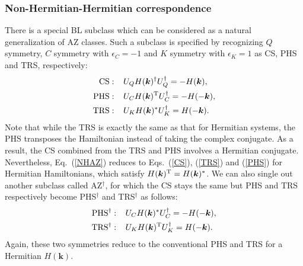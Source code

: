 \documentclass{tADP2e}
\theoremstyle{plain}
\theoremstyle{plain}
\theoremstyle{definition}
\begin{document}
\subsubsection{Non-Hermitian-Hermitian correspondence}
\label{Sec:NHHC}
There is a special BL subclass which can be considered as a natural generalization of AZ classes. Such a subclass is specified by recognizing $Q$ symmetry, $C$ symmetry with $\epsilon_C=-1$ and $K$ symmetry with $\epsilon_K=1$ as CS, PHS and TRS, respectively:
\begin{equation}
\begin{split}
{\rm CS:}\;\;\;\; &U_QH(\boldsymbol{k})^\dag U_Q^\dag=-H(\boldsymbol{k}), \\
{\rm PHS:}\;\;\;\; &U_CH(\boldsymbol{k})^{\rm T}U_C^\dag=-H(-\boldsymbol{k}),  \\
{\rm TRS:}\;\;\;\; &U_KH(\boldsymbol{k})^*U_K^\dag=H(-\boldsymbol{k}). \\
\end{split}
\label{NHAZ}
\end{equation}
Note that while the TRS is exactly the same as that for Hermitian systems, the PHS transposes the Hamiltonian instead of taking the complex conjugate. As a result, the CS combined from the TRS and PHS involves a Hermitian conjugate. Nevertheless, Eq.~(\ref{NHAZ}) reduces to Eqs.~(\ref{CS}), (\ref{TRS}) and (\ref{PHS}) for Hermitian Hamiltonians, which satisfy $H(\boldsymbol{k})^{\rm T}=H(\boldsymbol{k})^*$. We can also single out another subclass called AZ$^\dag$, for which the CS stays the same but  PHS and TRS respectively become PHS$^\dagger$ and TRS$^\dagger$ as follows:
\begin{equation}
\begin{split}
{\rm PHS^\dag:}\;\;\;\; &U_CH(\boldsymbol{k})^*U_C^\dag=-H(-\boldsymbol{k}),  \\
{\rm TRS^\dag:}\;\;\;\; &U_KH(\boldsymbol{k})^{\rm T}U_K^\dag=H(-\boldsymbol{k}). \\
\end{split}
\label{NHAZdag}
\end{equation} 
Again, these two symmetries reduce to the conventional PHS and TRS for a Hermitian $H(\boldsymbol{k})$. 
\end{document}
